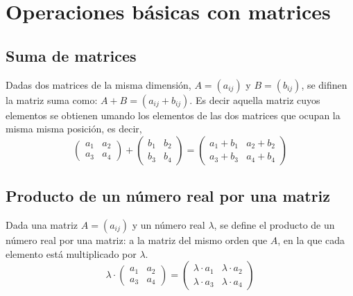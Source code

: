 \documentclass{article}
\numberwithin{equation}{section}
\theoremstyle{plain}  %
\begin{document}
\section{Operaciones básicas con matrices}

    \subsection{Suma de matrices}
    Dadas dos matrices de la misma dimensión, $A=(a_{ij})$ y $B=(b_{ij})$, se difinen la matriz suma como:
    $A+B=(a_{ij}+b_{ij})$. Es decir aquella matriz cuyos elementos se obtienen umando los elementos de las 
    dos matrices que ocupan la misma misma posición, es decir,
    \begin{equation*}
        \begin{pmatrix}
            a_{1} & a_{2}\\
            a_{3} & a_{4}
        \end{pmatrix}
        + 
        \begin{pmatrix}
            b_{1} & b_{2} \\ 
            b_{3} & b_{4}
        \end{pmatrix}
        = 
        \begin{pmatrix}
            a_{1}+b_{1} & a_{2}+b_{2} \\ 
            a_{3}+b_{3} & a_{4}+b_{4}
        \end{pmatrix}
    \end{equation*}
    \subsection{Producto de un número real por una matriz} 
    Dada una matriz $A=(a_{ij})$ y un número real $\lambda$, 
    se define el producto de un número real por una matriz: a la matriz del mismo orden que 
    $A$, en la que cada elemento está multiplicado por $\lambda$.
    \begin{equation*}
        \lambda \cdot
        \begin{pmatrix}
            a_{1} & a_{2} \\ 
            a_{3} & a_{4}
        \end{pmatrix}
        =
        \begin{pmatrix}
            \lambda \cdot a_{1} & \lambda \cdot a_{2} \\ 
            \lambda \cdot a_{3} & \lambda \cdot a_{4}
        \end{pmatrix}
    \end{equation*}
\end{document}
